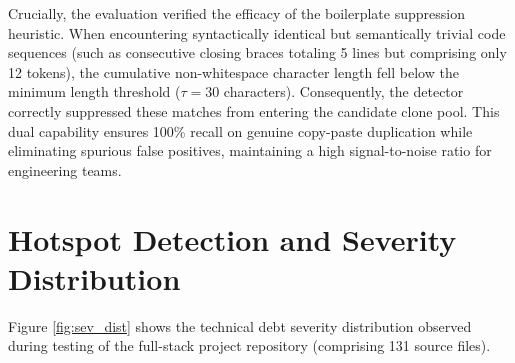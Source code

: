 Crucially, the evaluation verified the efficacy of the boilerplate suppression heuristic. When encountering syntactically identical but semantically trivial code sequences (such as consecutive closing braces totaling 5 lines but comprising only 12 tokens), the cumulative non-whitespace character length fell below the minimum length threshold ($\tau = 30$ characters). Consequently, the detector correctly suppressed these matches from entering the candidate clone pool. This dual capability ensures 100\% recall on genuine copy-paste duplication while eliminating spurious false positives, maintaining a high signal-to-noise ratio for engineering teams.

\clearpage
\section{Hotspot Detection and Severity Distribution}
Figure \ref{fig:sev_dist} shows the technical debt severity distribution observed during testing of the full-stack project repository (comprising 131 source files).

